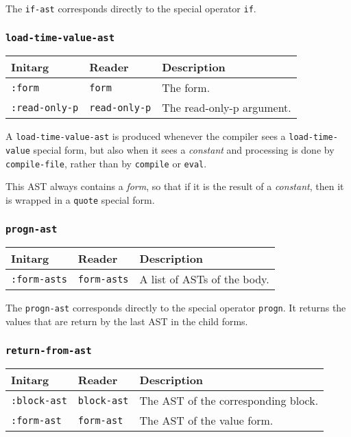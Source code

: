 The \texttt{if-ast} corresponds directly to the \commonlisp{} special operator
\texttt{if}. 

\subsubsection{\texttt{load-time-value-ast}}
\label{load-time-value-ast}

\begin{tabular}{|l|l|l|}
\hline
Initarg & Reader & Description\\
\hline\hline
\texttt{:form} & \texttt{form} & The form.\\
\texttt{:read-only-p} & \texttt{read-only-p} & The read-only-p argument.\\
\hline
\end{tabular}

A \texttt{load-time-value-ast} is produced whenever the compiler sees
a \texttt{load-time-value} special form, but also when it sees a
\emph{constant} and processing is done by \texttt{compile-file},
rather than by \texttt{compile} or \texttt{eval}.  

This AST always contains a \emph{form}, so that if it is the result of
a \emph{constant}, then it is wrapped in a \texttt{quote} special
form. 

\subsubsection{\texttt{progn-ast}}
\label{progn-ast}

\begin{tabular}{|l|l|l|}
\hline
Initarg & Reader & Description\\
\hline\hline
\texttt{:form-asts} & \texttt{form-asts} & A list of ASTs of the body.\\
\hline
\end{tabular}

The \texttt{progn-ast} corresponds directly to the \commonlisp{} special
operator \texttt{progn}.  It returns the values that are return by the
last AST in the child forms.

\subsubsection{\texttt{return-from-ast}}
\label{return-from-ast}

\begin{tabular}{|l|l|l|}
\hline
Initarg & Reader & Description\\
\hline\hline
\texttt{:block-ast} & \texttt{block-ast} & The AST of the
corresponding block.\\
\hline
\texttt{:form-ast} & \texttt{form-ast} & The AST of the value form.\\
\hline
\end{tabular}


